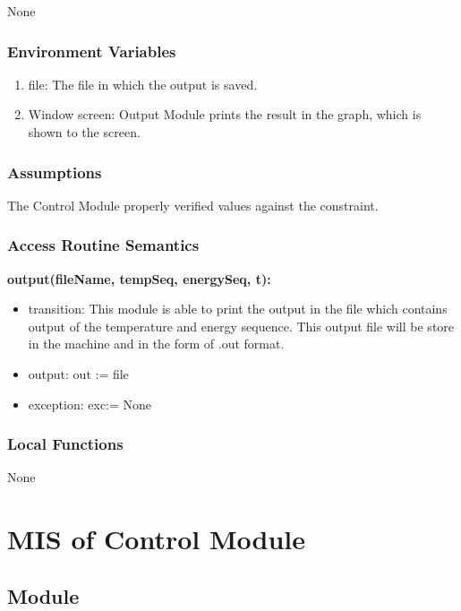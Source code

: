 \documentclass[12pt, titlepage]{article}
\begin{document}
None

\subsubsection{Environment Variables}

\begin{enumerate}
    \item file: The file in which the output is saved. 
    \item Window screen: Output Module prints the result in the graph, which is shown to the screen. 
\end{enumerate}


\subsubsection{Assumptions}

The Control Module properly verified values against the constraint.   

\subsubsection{Access Routine Semantics}

\noindent \textbf{output(fileName, tempSeq, energySeq, t):}
\begin{itemize}
\item transition: This module is able to print the output in the file which contains output of the temperature and energy sequence. This output file will be store in the machine and in the form of .out format.  
\item output: out := file
\item exception: exc:= None 
\end{itemize}

\subsubsection{Local Functions}

None

\newpage
\section{MIS of Control Module} \label{SCEC_Control_Module} 

\subsection{Module}
\end{document}
